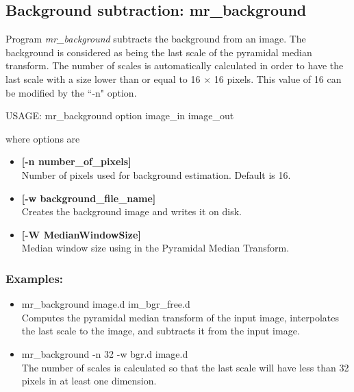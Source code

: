 \subsection{Background subtraction: mr\_background}

\label{sect_bgr}
 Program 
{\em mr\_background} subtracts the background from an image. The
background is considered as being the last scale of the pyramidal
median transform. The number of scales is automatically calculated in order
to have the last scale with a size lower than or equal to 16 $\times$ 
16 pixels. 
This value of 16 can 
be modified by the ``-n" option.
{\bf
\begin{center}
 USAGE: mr\_background option image\_in image\_out
\end{center}}
where options are 
\begin{itemize}
\baselineskip=0.4truecm
\itemsep=0.1truecm
\item {\bf [-n number\_of\_pixels]} \\
Number of pixels used for background estimation. Default is 16.
\item {\bf [-w background\_file\_name]} \\
Creates the background image and writes it on disk.
\item {\bf [-W MedianWindowSize]} \\
Median window size using in the Pyramidal Median Transform.
\end{itemize}
\subsubsection*{Examples:}
\begin{itemize}
\baselineskip=0.4truecm
\itemsep=0.1truecm
\item mr\_background image.d  im\_bgr\_free.d\\
Computes the pyramidal median transform of the input image, 
interpolates the last scale to the image, and subtracts it from
the input image.
\item mr\_background -n 32 -w bgr.d image.d  \\
The number of scales is calculated so that the last scale
will have less than 32 pixels in at least one dimension.
\end{itemize}

